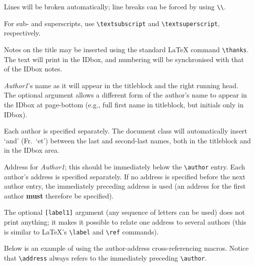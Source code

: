 \begin{description} \itemsep=0pt
   \item [{\tt \blash title\char`\{...\char`\}}] \mbox{}

         Lines will be broken automatically; line breaks can be forced
         by using \verb|\\|. 

         For sub- and superscripts, use \verb|\textsubscript| and
         \verb|\textsuperscript|, respectively.

         Notes on the title may be inserted using the standard \LaTeX{}
         command \verb|\thanks|. The text will print in the IDbox, and
         numbering will be synchronised with that of the IDbox notes.

   \item [{\tt \blash author[...]\char`\{Author1\char`\}}] \mbox{}

         {\sl Author1\/}'s name as it will appear in the titleblock
         and the right running head. The optional argument allows a
         different form of the author's name to appear in the IDbox at
         page-bottom (e.g., full first name in titleblock, but
         initials only in IDbox).

         Each author is specified separately. The document class will
         automatically insert `and' (Fr.\ `et') between the last and
         second-last names, both in the titleblock and in the IDbox
         area.

   \item [{\tt \blash address[label1]\char`\{addr1\char`\}}] \mbox{}

         Address for {\sl Author1\/}; this should be immediately below
         the \verb|\author| entry. Each author's address is specified
         separately. If no address is specified before the next author
         entry, the immediately preceding address is used (an address
         for the first author {\bf must} therefore be specified).

         The optional \verb|[label1]| argument (any sequence of
         letters can be used) does not print anything; it makes it
         possible to relate one address to several authors (this is
         similar to \LaTeX's \verb|\label| and \verb|\ref| commands).
\end{description}

Below is an example of using the author-address cross-referencing
macros. Notice that \verb|\address| always refers to the immediately
preceding \verb|\author|.
         
